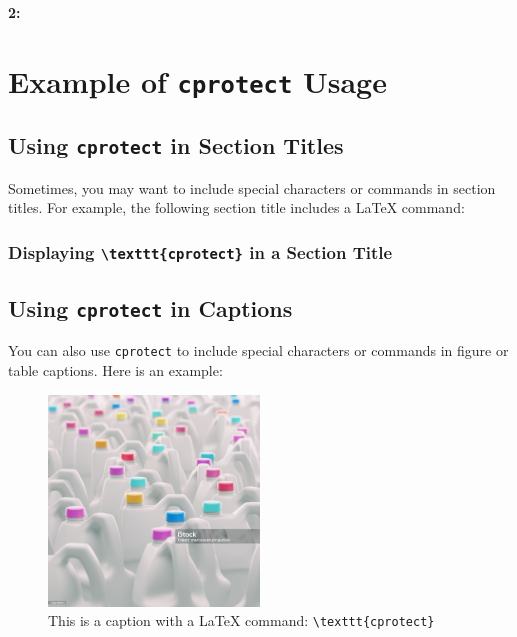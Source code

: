 \documentclass[]{article}
\begin{document}
\vspace{5mm}\noindent\textbf{2:}

\section{Example of \texorpdfstring{\texttt{cprotect}}{cprotect} Usage}

\cprotect\subsection{Using \texorpdfstring{\protect\texttt{cprotect}}{cprotect} in Section Titles}

Sometimes, you may want to include special characters or commands in section titles. For example, the following section title includes a LaTeX command:

\cprotect\subsubsection{Displaying \protect\texttt{\textbackslash texttt\{cprotect\}} in a Section Title}

\cprotect\subsection{Using \protect\texttt{cprotect} in Captions}

You can also use \texttt{cprotect} to include special characters or commands in figure or table captions. Here is an example:

\begin{figure}[!ht]
    \centering
    \includegraphics[width=0.5\textwidth]{assets/example-image.jpg}
    \cprotect\caption{This is a caption with a LaTeX command: \texttt{\textbackslash texttt\{cprotect\}}}
\end{figure}
\end{document}
